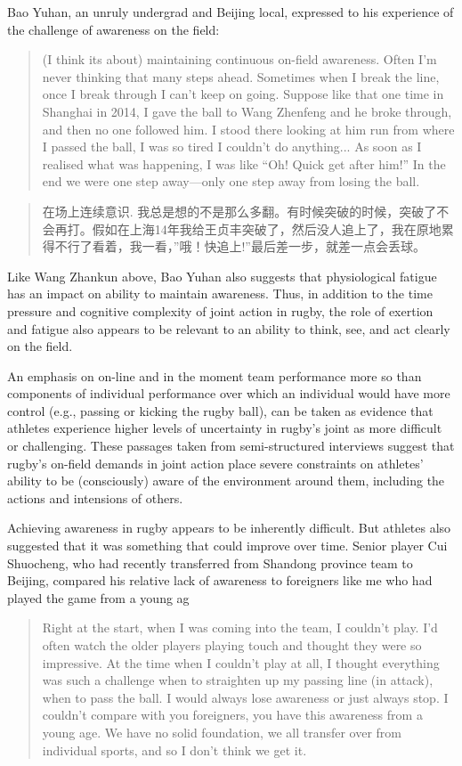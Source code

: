\begin{CJK}{UTF8}{gbsn}
Bao Yuhan, an unruly undergrad and Beijing local, expressed to his experience of the challenge of awareness on the field:
    \begin{quote}
    (I think its about) maintaining continuous on-field awareness.  Often I'm never thinking that many steps ahead.  Sometimes when I break the line, once I break through I can't keep on going.  Suppose like that one time in Shanghai in 2014, I gave the ball to Wang Zhenfeng and he broke through, and then no one followed him.  I stood there looking at him run from where I passed the ball, I was so tired I couldn't do anything... As soon as I realised what was happening, I was like ``Oh! Quick get after him!'' In the end we were one step away---only one step away from losing the ball.
    \end{quote}

    \begin{quote}
    在场上连续意识. 我总是想的不是那么多翻。有时候突破的时候，突破了不会再打。假如在上海14年我给王贞丰突破了，然后没人追上了，我在原地累得不行了看着，我一看，''哦！快追上!''最后差一步，就差一点会丢球。
    \end{quote}

Like Wang Zhankun above, Bao Yuhan also suggests that physiological fatigue has an impact on ability to maintain awareness.  Thus, in addition to the time pressure and cognitive complexity of joint action in rugby, the role of exertion and fatigue also appears to be relevant to an ability to think, see, and act clearly on the field.

An emphasis on on-line and in the moment team performance more so than components of individual performance over which an individual would have more control (e.g., passing or kicking the rugby ball), can be taken as evidence that athletes experience higher levels of uncertainty in rugby's joint as more difficult or challenging.
  These passages taken from semi-structured interviews suggest that rugby's on-field demands in joint action place severe constraints on athletes' ability to be (consciously) aware of the environment around them, including the actions and intensions of others.

Achieving awareness in rugby appears to be inherently difficult.  But athletes also suggested that it was something that could improve over time.  Senior player Cui Shuocheng, who had recently transferred from Shandong province team to Beijing, compared his relative lack of awareness to foreigners like me who had played the game from a young ag
      \begin{quote}
      Right at the start, when I was coming into the team, I couldn't play. I'd often watch the older players playing touch and thought they were so impressive.  At the time when I couldn't play at all, I thought everything was such a challenge  when to straighten up my passing line (in attack), when to pass the ball.  I would always lose awareness or just always stop. I couldn't compare with you foreigners, you have this awareness from a young age.  We have no solid foundation, we all transfer over from individual sports, and so I don't think we get it.
      \end{quote}


\end{CJK}
